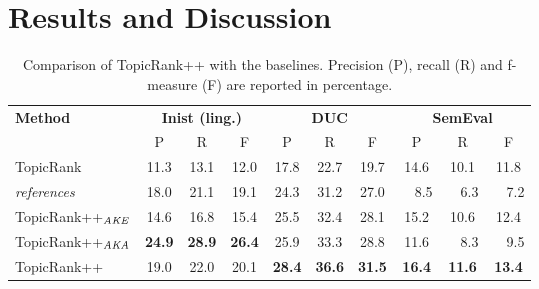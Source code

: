 \section{Results and Discussion}
\label{sec:results}
  \begin{table*}
    \centering
      \begin{tabular}{l|ccc|ccc|ccc}
        \toprule
        \multirow{2}{*}{\textbf{Method}} & \multicolumn{3}{c|}{\textbf{Inist (ling.)}} & \multicolumn{3}{c|}{\textbf{DUC}} & \multicolumn{3}{c}{\textbf{SemEval}}\\
        \cline{2-10}
        & P & R & F & P & R & F & P & R & F\\
        \hline
        TopicRank & 11.3 & 13.1 & 12.0 & 17.8 & 22.7 & 19.7 & 14.6 & 10.1 & 11.8\\
        \textit{references} & 18.0 & 21.1 & 19.1 & 24.3 & 31.2 & 27.0 & ~~8.5 & ~~6.3 & ~~7.2\\
        \hline
        TopicRank++$_\textnormal{\textit{AKE}}$ & 14.6 & 16.8 & 15.4 & 25.5 & 32.4 & 28.1 & 15.2 & 10.6 & 12.4\\
        TopicRank++$_\textnormal{\textit{AKA}}$ & \textbf{24.9} & \textbf{28.9} & \textbf{26.4} & 25.9 & 33.3 & 28.8 & 11.6 & ~~8.3 & ~~9.5\\
        \hline
        TopicRank++ & 19.0 & 22.0 & 20.1 & \textbf{28.4} & \textbf{36.6} & \textbf{31.5} & \textbf{16.4} & \textbf{11.6} & \textbf{13.4}\\
        \bottomrule
      \end{tabular}
    \caption{Comparison of TopicRank++ with the baselines. Precision (P), recall
             (R) and f-measure (F) are reported in percentage.
             \label{tab:comparison_results}}
  \end{table*}


